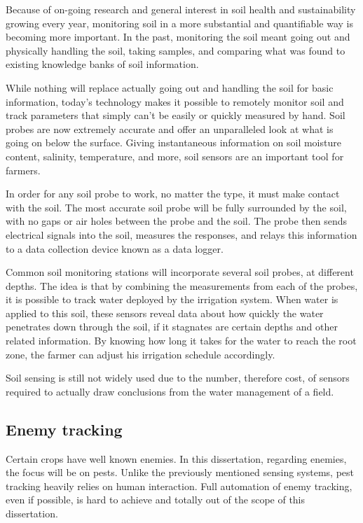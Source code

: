 Because of on-going research and general interest in soil health and sustainability growing every year, monitoring soil in a more substantial and quantifiable way is becoming more important. In the past, monitoring the soil meant going out and physically handling the soil, taking samples, and comparing what was found to existing knowledge banks of soil information.

While nothing will replace actually going out and handling the soil for basic information, today's technology makes it possible to remotely monitor soil and track parameters that simply can't be easily or quickly measured by hand. Soil probes are now extremely accurate and offer an unparalleled look at what is going on below the surface. Giving instantaneous information on soil moisture content, salinity, temperature, and more, soil sensors are an important tool for farmers.

In order for any soil probe to work, no matter the type, it must make contact with the soil. The most accurate soil probe will be fully surrounded by the soil, with no gaps or air holes between the probe and the soil. The probe then sends electrical signals into the soil, measures the responses, and relays this information to a data collection device known as a data logger.

Common soil monitoring stations will incorporate several soil probes, at different depths. The idea is that by combining the measurements from each of the probes, it is possible to track water deployed by the irrigation system. When water is applied to this soil, these sensors reveal data about how quickly the water penetrates down through the soil, if it stagnates are certain depths and other related information. By knowing how long it takes for the water to reach the root zone, the farmer can adjust his irrigation schedule accordingly. 

Soil sensing is still not widely used due to the number, therefore cost, of sensors required to actually draw conclusions from the water management of a field.


\subsection{Enemy tracking}

Certain crops have well known enemies. In this dissertation, regarding enemies, the focus will be on pests. Unlike the previously mentioned sensing systems, pest tracking heavily relies on human interaction. Full automation of enemy tracking, even if possible, is hard to achieve and totally out of the scope of this dissertation. 

